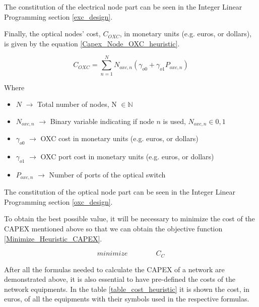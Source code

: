The constitution of the electrical node part can be seen in the Integer Linear Programming section \ref{exc_design}.

Finally, the optical nodes' cost, $C_{OXC}$, in monetary units (e.g. euros, or dollars), is given by the equation \ref{Capex_Node_OXC_heuristic}.

\begin{equation}
C_{OXC} = \sum_{n=1}^{N} N_{oxc,n} \left( \gamma_{o0} + \gamma_{o1} P_{oxc,n} \right)
\label{Capex_Node_OXC_heuristic}
\end{equation}

Where

\begin{itemize}
\item{$N$				$\rightarrow$	Total number of nodes, N $\in \mathbb{N}$}
\item{$N_{oxc,n}$		$\rightarrow$	Binary variable indicating if node $n$ is used, $N_{oxc,n} \in {0, 1}$}
\item{$\gamma_{o0}$ 	$\rightarrow$	OXC cost in monetary units (e.g. euros, or dollars)}
\item{$\gamma_{o1}$ 	$\rightarrow$	OXC port cost in monetary units (e.g. euros, or dollars) }
\item{$P_{oxc,n}$	    $\rightarrow$	Number of ports of the optical switch}
\end{itemize}

The constitution of the optical node part can be seen in the Integer Linear Programming section \ref{oxc_design}.

To obtain the best possible value, it will be necessary to minimize the cost of the CAPEX mentioned above so that we can obtain the objective function \ref{Minimize_Heuristic_CAPEX}.

\begin{equation}
minimize \qquad \qquad C_C
\label{Minimize_Heuristic_CAPEX}
\end{equation}

After all the formulas needed to calculate the CAPEX of a network are demonstrated above, it is also essential to have pre-defined the costs of the network equipments. In the table \ref{table_cost_heuristic} it is shown the cost, in euros, of all the equipments with their symbols used in the respective formulas.\\

